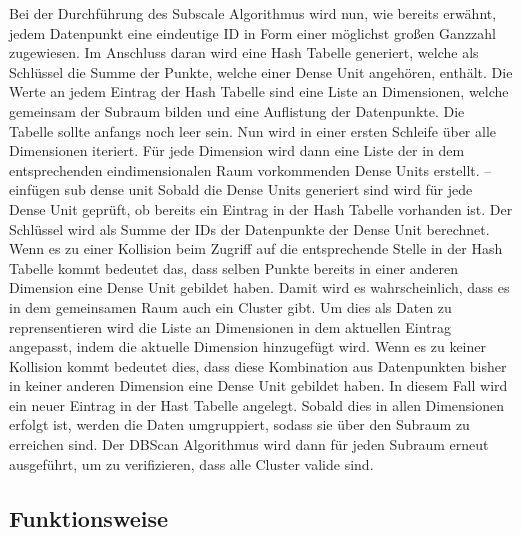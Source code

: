 \documentclass[utf8,biblatex]{lni}
\begin{document}
Bei der Durchführung des Subscale Algorithmus wird nun, wie bereits erwähnt, jedem Datenpunkt eine eindeutige ID in Form einer möglichst großen Ganzzahl zugewiesen. 
Im Anschluss daran wird eine Hash Tabelle generiert, welche als Schlüssel die Summe der Punkte, welche einer Dense Unit angehören, enthält. 
Die Werte an jedem Eintrag der Hash Tabelle sind eine Liste an Dimensionen, welche gemeinsam der Subraum bilden und eine Auflistung der Datenpunkte. 
Die Tabelle sollte anfangs noch leer sein. 
Nun wird in einer ersten Schleife über alle Dimensionen iteriert. 
Für jede Dimension wird dann eine Liste der in dem entsprechenden eindimensionalen Raum vorkommenden Dense Units erstellt. 
--einfügen sub dense unit
Sobald die Dense Units generiert sind wird für jede Dense Unit geprüft, ob bereits ein Eintrag in der Hash Tabelle vorhanden ist. 
Der Schlüssel wird als Summe der IDs der Datenpunkte der Dense Unit berechnet. 
Wenn es zu einer Kollision beim Zugriff auf die entsprechende Stelle in der Hash Tabelle kommt bedeutet das, dass selben Punkte bereits in einer anderen Dimension eine Dense Unit gebildet haben. 
Damit wird es wahrscheinlich, dass es in dem gemeinsamen Raum auch ein Cluster gibt. 
Um dies als Daten zu reprensentieren wird die Liste an Dimensionen in dem aktuellen Eintrag angepasst, indem die aktuelle Dimension hinzugefügt wird. 
Wenn es zu keiner Kollision kommt bedeutet dies, dass diese Kombination aus Datenpunkten bisher in keiner anderen Dimension eine Dense Unit gebildet haben. 
In diesem Fall wird ein neuer Eintrag in der Hast Tabelle angelegt. 
Sobald dies in allen Dimensionen erfolgt ist, werden die Daten umgruppiert, sodass sie über den Subraum zu erreichen sind. 
Der DBScan Algorithmus wird dann für jeden Subraum erneut ausgeführt, um zu verifizieren, dass alle Cluster valide sind. 

\subsection{Funktionsweise}
\end{document}
